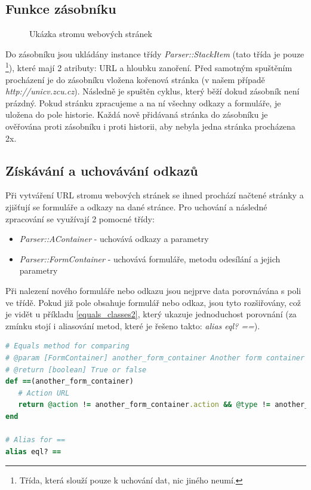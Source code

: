 \documentclass[12pt, a4paper]{report}
\begin{document}
\subsection{Funkce zásobníku}
\begin{figure}[h!]
\caption{Ukázka stromu webových stránek}
\label{obr.url_tree}
\end{figure}
Do zásobníku jsou ukládány instance třídy \textit{Parser::StackItem} (tato třída je pouze \footnote{Třída, která slouží pouze k uchování dat, nic jiného neumí.}), které mají 2 atributy: URL a hloubku zanoření. Před samotným spuštěním procházení je do zásobníku vložena kořenová stránka (v našem případě \textit{http://unicv.zcu.cz}). Následně je spuštěn cyklus, který běží dokud zásobník není prázdný. Pokud stránku zpracujeme a na ní všechny odkazy a formuláře, je uložena do pole historie. Každá nově přidávaná stránka do zásobníku je ověřována proti zásobníku i proti historii, aby nebyla jedna stránka procházena 2x.

\subsection{Získávání a uchovávání odkazů}
Při vytváření URL stromu webových stránek se ihned prochází načtené stránky a zjišťují se formuláře a odkazy na dané stránce. Pro uchování a následné zpracování se využívají 2 pomocné třídy:
\begin{itemize}
\item \textit{Parser::AContainer} - uchovává odkazy a parametry
\item \textit{Parser::FormContainer} - uchovává formuláře, metodu odesílání a jejich parametry
\end{itemize}
Při nalezení nového formuláře nebo odkazu jsou nejprve data porovnávána s poli ve třídě. Pokud již pole obsahuje formulář nebo odkaz, jsou tyto rozšiřovány, což je vidět u příkladu \ref{equals_classes2}, který ukazuje jednoduchost porovnání (za zmínku stojí i aliasování metod, které je řešeno takto: \textit{alias eql? ==}).

\begin{lstlisting}[label=equals_classes2,language=Ruby, caption=Porovnání dvou instancí třídy FormContainer]
# Equals method for comparing
# @param [FormContainer] another_form_container Another form container
# @return [boolean] True or false
def ==(another_form_container)
   # Action URL
   return @action != another_form_container.action && @type != another_form_container.type &&  @params != another_form_container.params
end

# Alias for ==
alias eql? ==
\end{lstlisting}
\end{document}
